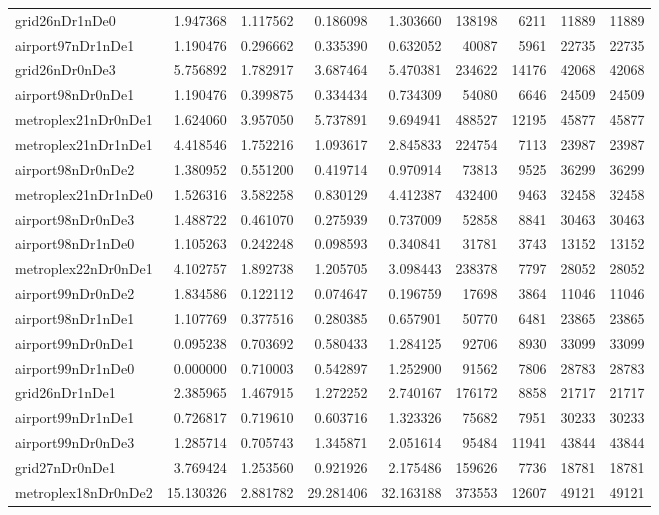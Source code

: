 \begin{longtable}{|l|r|r|r|r|r|r|r|r|}
grid26nDr1nDe0 & 1.947368 & 1.117562 & 0.186098 & 1.303660 & 138198 & 6211 & 11889 & 11889 \\
airport97nDr1nDe1 & 1.190476 & 0.296662 & 0.335390 & 0.632052 & 40087 & 5961 & 22735 & 22735 \\
grid26nDr0nDe3 & 5.756892 & 1.782917 & 3.687464 & 5.470381 & 234622 & 14176 & 42068 & 42068 \\
airport98nDr0nDe1 & 1.190476 & 0.399875 & 0.334434 & 0.734309 & 54080 & 6646 & 24509 & 24509 \\
metroplex21nDr0nDe1 & 1.624060 & 3.957050 & 5.737891 & 9.694941 & 488527 & 12195 & 45877 & 45877 \\
metroplex21nDr1nDe1 & 4.418546 & 1.752216 & 1.093617 & 2.845833 & 224754 & 7113 & 23987 & 23987 \\
airport98nDr0nDe2 & 1.380952 & 0.551200 & 0.419714 & 0.970914 & 73813 & 9525 & 36299 & 36299 \\
metroplex21nDr1nDe0 & 1.526316 & 3.582258 & 0.830129 & 4.412387 & 432400 & 9463 & 32458 & 32458 \\
airport98nDr0nDe3 & 1.488722 & 0.461070 & 0.275939 & 0.737009 & 52858 & 8841 & 30463 & 30463 \\
airport98nDr1nDe0 & 1.105263 & 0.242248 & 0.098593 & 0.340841 & 31781 & 3743 & 13152 & 13152 \\
metroplex22nDr0nDe1 & 4.102757 & 1.892738 & 1.205705 & 3.098443 & 238378 & 7797 & 28052 & 28052 \\
airport99nDr0nDe2 & 1.834586 & 0.122112 & 0.074647 & 0.196759 & 17698 & 3864 & 11046 & 11046 \\
airport98nDr1nDe1 & 1.107769 & 0.377516 & 0.280385 & 0.657901 & 50770 & 6481 & 23865 & 23865 \\
airport99nDr0nDe1 & 0.095238 & 0.703692 & 0.580433 & 1.284125 & 92706 & 8930 & 33099 & 33099 \\
airport99nDr1nDe0 & 0.000000 & 0.710003 & 0.542897 & 1.252900 & 91562 & 7806 & 28783 & 28783 \\
grid26nDr1nDe1 & 2.385965 & 1.467915 & 1.272252 & 2.740167 & 176172 & 8858 & 21717 & 21717 \\
airport99nDr1nDe1 & 0.726817 & 0.719610 & 0.603716 & 1.323326 & 75682 & 7951 & 30233 & 30233 \\
airport99nDr0nDe3 & 1.285714 & 0.705743 & 1.345871 & 2.051614 & 95484 & 11941 & 43844 & 43844 \\
grid27nDr0nDe1 & 3.769424 & 1.253560 & 0.921926 & 2.175486 & 159626 & 7736 & 18781 & 18781 \\
metroplex18nDr0nDe2 & 15.130326 & 2.881782 & 29.281406 & 32.163188 & 373553 & 12607 & 49121 & 49121 \\

\end{longtable}
